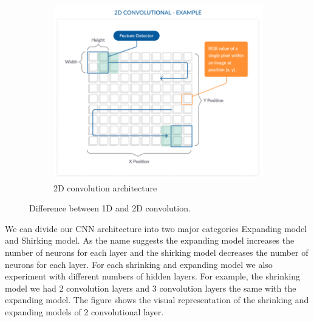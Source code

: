 \begin{figure}[h!]
\begin{subfigure}[b]{0.4\linewidth}
    \includegraphics[width=\linewidth]{figures/2Dconv.png}
    \caption{2D convolution architecture}
  \end{subfigure}
 \caption{Difference between 1D and 2D convolution.}
  \label{fig:diff1D2D}
\end{figure}

We can divide our CNN architecture into two major categories Expanding model and Shirking model. As the name suggests the expanding model increases the number of neurons for each layer and the shirking model decreases the number of neurons for each layer. For each shrinking and expanding model we also experiment with different numbers of hidden layers.
For example, the shrinking model we had 2 convolution layers and 3 convolution layers the same with the expanding model. The figure shows the visual representation of the shrinking and expanding models of 2 convolutional layer.



